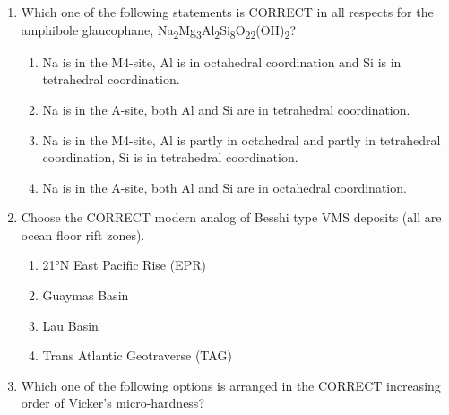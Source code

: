 \documentclass[journal,12pt,onecolumn]{IEEEtran}
\begin{document}
\begin{enumerate}
\begin{enumerate}
\hfill{}

\begin{multicols}{2}
\begin{enumerate}
\item 34 – 15 million years
\item 56 – 34 million years
\item 65 – 56 million years
\item 100 – 65 million years
\end{enumerate}
\end{multicols}

\item Which one of the following statements is CORRECT in all respects for the amphibole glaucophane, Na\textsubscript{2}Mg\textsubscript{3}Al\textsubscript{2}Si\textsubscript{8}O\textsubscript{22}(OH)\textsubscript{2}?

\hfill{}


\begin{enumerate}
\item Na is in the M4-site, Al is in octahedral coordination and Si is in tetrahedral coordination.
\item Na is in the A-site, both Al and Si are in tetrahedral coordination.
\item Na is in the M4-site, Al is partly in octahedral and partly in tetrahedral coordination, Si is in tetrahedral coordination.
\item Na is in the A-site, both Al and Si are in octahedral coordination.
\end{enumerate}


\item Choose the CORRECT modern analog of Besshi type VMS deposits (all are ocean floor rift zones).

\hfill{}

\begin{multicols}{2}
\begin{enumerate}
\item 21°N East Pacific Rise (EPR)
\item Guaymas Basin
\item Lau Basin
\item Trans Atlantic Geotraverse (TAG)
\end{enumerate}
\end{multicols}

\item Which one of the following options is arranged in the CORRECT increasing order of Vicker's micro-hardness?


\end{enumerate}
\end{enumerate}
\end{document}
